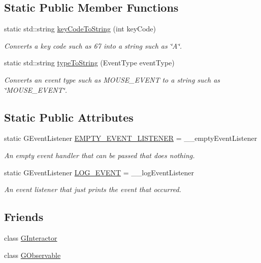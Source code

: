 \subsection*{Static Public Member Functions}
\begin{DoxyCompactItemize}
\item 
static std\+::string \mbox{\hyperlink{classGEvent_a6e882459d29785fb753a3bf23f29cbc3}{key\+Code\+To\+String}} (int key\+Code)
\begin{DoxyCompactList}\small\item\em Converts a key code such as 67 into a string such as \char`\"{}\+A\char`\"{}. \end{DoxyCompactList}\item 
static std\+::string \mbox{\hyperlink{classGEvent_abfc45737c7f2e261401203a0c959c103}{type\+To\+String}} (Event\+Type event\+Type)
\begin{DoxyCompactList}\small\item\em Converts an event type such as M\+O\+U\+S\+E\+\_\+\+E\+V\+E\+NT to a string such as \char`\"{}\+M\+O\+U\+S\+E\+\_\+\+E\+V\+E\+N\+T\char`\"{}. \end{DoxyCompactList}\end{DoxyCompactItemize}
\subsection*{Static Public Attributes}
\begin{DoxyCompactItemize}
\item 
static G\+Event\+Listener \mbox{\hyperlink{classGEvent_ad4e5235f4489609eefdb603ed8d19c3d}{E\+M\+P\+T\+Y\+\_\+\+E\+V\+E\+N\+T\+\_\+\+L\+I\+S\+T\+E\+N\+ER}} = \+\_\+\+\_\+empty\+Event\+Listener
\begin{DoxyCompactList}\small\item\em An empty event handler that can be passed that does nothing. \end{DoxyCompactList}\item 
static G\+Event\+Listener \mbox{\hyperlink{classGEvent_ad9cb77a13a97c2de6a7f1bcb09f961ed}{L\+O\+G\+\_\+\+E\+V\+E\+NT}} = \+\_\+\+\_\+log\+Event\+Listener
\begin{DoxyCompactList}\small\item\em An event listener that just prints the event that occurred. \end{DoxyCompactList}\end{DoxyCompactItemize}
\subsection*{Friends}
\begin{DoxyCompactItemize}
\item 
class \mbox{\hyperlink{classGEvent_a054e99eaa992da5c1a77c8d7b3817788}{G\+Interactor}}
\item 
class \mbox{\hyperlink{classGEvent_ab2c4a87c15be41d9bef82e78272b6a70}{G\+Observable}}
\end{DoxyCompactItemize}


